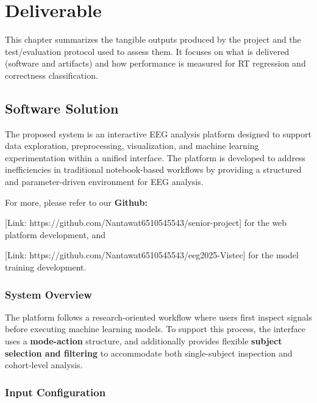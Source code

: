 \chapter{Deliverable}
\label{chap:deliverable}

\noindent
This chapter summarizes the tangible outputs produced by the project and the test/evaluation protocol used to assess them. It focuses on what is delivered (software and artifacts) and how performance is measured for RT regression and correctness classification.
\vspace{1em}

\section{Software Solution}
\label{sec:software-solution}

The proposed system is an interactive EEG analysis platform designed to support data exploration, preprocessing, visualization, and machine learning experimentation within a unified interface. The platform is developed to address inefficiencies in traditional notebook-based workflows by providing a structured and parameter-driven environment for EEG analysis.

For more, please refer to our \textbf{Github:}

	[Link: https://github.com/Nantawat6510545543/senior-project] for the web platform development, and
	\vspace{0.5em}

	[Link: https://github.com/Nantawat6510545543/eeg2025-Vistec] for the model training development.


\subsection{System Overview}
\label{sec:system-overview}
The platform follows a research-oriented workflow where users first inspect signals before executing machine learning models.
To support this process, the interface uses a \textbf{mode-action} structure, and additionally provides flexible 
\textbf{subject selection and filtering} to accommodate both single-subject inspection and cohort-level analysis.

\subsection{Input Configuration}
\label{sec:input-configuration}

